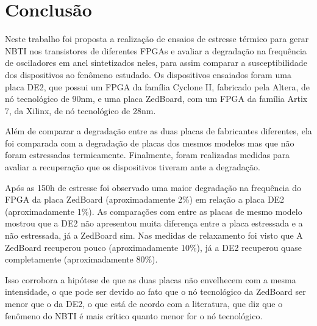\chapter{Conclusão}
\label{Conclusao}

Neste trabalho foi proposta a realização de ensaios de estresse térmico para gerar NBTI nos transistores de diferentes FPGAs e avaliar a degradação na frequência de osciladores em anel sintetizados neles, para assim comparar a susceptibilidade dos dispositivos ao fenômeno estudado. Os dispositivos ensaiados foram uma placa DE2, que possui um FPGA da família Cyclone II, fabricado pela Altera, de nó tecnológico de 90nm, e uma placa ZedBoard, com um FPGA da família Artix 7, da Xilinx, de nó tecnológico de 28nm.

Além de comparar a degradação entre as duas placas de fabricantes diferentes, ela foi comparada com a degradação de placas dos mesmos modelos mas que não foram estressadas termicamente. Finalmente, foram realizadas medidas para avaliar a recuperação que os dispositivos tiveram ante a degradação.

Após as 150h de estresse foi observado uma maior degradação na frequência do FPGA da placa ZedBoard (aproximadamente 2\%) em relação a placa DE2 (aproximadamente 1\%). As comparações com entre as placas de mesmo modelo mostrou que a DE2 não apresentou muita diferença entre a placa estressada e a não estressada, já a ZedBoard sim. Nas medidas de relaxamento foi visto que A ZedBoard recuperou pouco (aproximadamente 10\%), já a DE2 recuperou quase completamente (aproximadamente 80\%).

Isso corrobora a hipótese de que as duas placas não envelhecem com a mesma intensidade, o que pode ser devido ao fato que o nó tecnológico da ZedBoard ser menor que o da DE2, o que está de acordo com a literatura, que diz que o fenômeno do NBTI é mais crítico quanto menor for o nó tecnológico.


